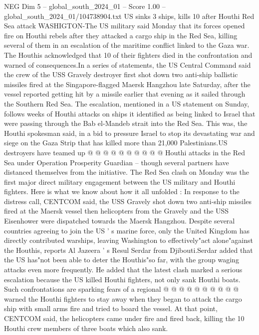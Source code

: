 \begin{textsample}{NEG Dim 5 – global\_south\_2024\_01 – Score 1.00 – global\_south\_2024\_01/104738904.txt}  \label{ex:f5_neg_445}
US sinks 3 ships, kills 10 after Houthi Red Sea attack WASHIGTON-The US military said Monday that its forces opened fire on Houthi rebels after they attacked a cargo ship in the Red Sea, killing several of them in an escalation of the maritime conflict linked to the Gaza war.
The Houthis acknowledged that 10 of their fighters died in the confrontation and warned of consequences.In a series of statements, the US Central Command said the crew of the USS Gravely destroyer first shot down two anti-ship ballistic missiles fired at the Singapore-flagged Maersk Hangzhou late Saturday, after the vessel reported getting hit by a missile earlier that evening as it sailed through the Southern Red Sea.
The escalation, mentioned in a US statement on Sunday, follows weeks of Houthi attacks on ships it identified as being linked to Israel that were passing through the Bab el-Mandeb strait into the Red Sea.
This was, the Houthi spokesman said, in a bid to pressure Israel to stop its devastating war and siege on the Gaza Strip that has killed more than 21,000 Palestinians.US destroyers have teamed up @ @ @ @ @ @ @ @ @ @ Houthi attacks in the Red Sea under Operation Prosperity Guardian -- though several partners have distanced themselves from the initiative.
The Red Sea clash on Monday was the first major direct military engagement between the US military and Houthi fighters.
Here is what we know about how it all unfolded : In response to the distress call, CENTCOM said, the USS Gravely shot down two anti-ship missiles fired at the Maersk vessel then helicopters from the Gravely and the USS Eisenhower were dispatched towards the Maersk Hangzhou.
Despite several countries agreeing to join the US ' s marine force, only the United Kingdom has directly contributed warships, leaving Washington to effectively"act alone"against the Houthis, reports Al Jazeera ' s Resul Serdar from Djibouti.Serdar added that the US has"not been able to deter the Houthis"so far, with the group waging attacks even more frequently.
He added that the latest clash marked a serious escalation because the US killed Houthi fighters, not only sank Houthi boats.
Such confrontations are sparking fears of a regional @ @ @ @ @ @ @ @ @ @ warned the Houthi fighters to stay away when they began to attack the cargo ship with small arms fire and tried to board the vessel.
At that point, CENTCOM said, the helicopters came under fire and fired back, killing the 10 Houthi crew members of three boats which also sank.

\end{textsample}
